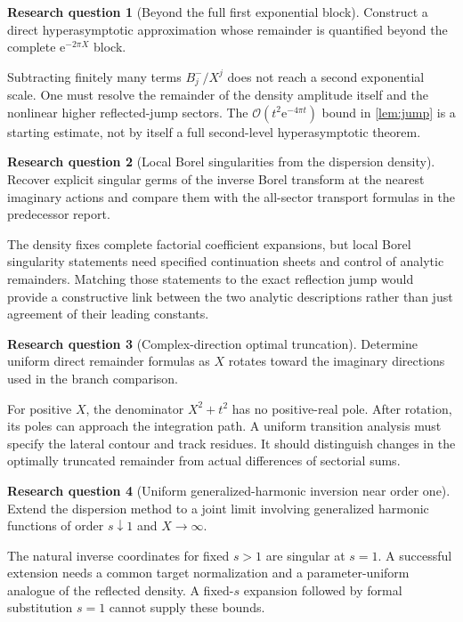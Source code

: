 \documentclass[11pt,a4paper]{article}
\theoremstyle{definition}
\newtheorem{problem}{Research question}
\numberwithin{equation}{section}
\newcommand{\ee}{\mathrm{e}}
\newcommand{\Oh}{\mathcal O}
\begin{document}
\begin{problem}[Beyond the full first exponential block]
Construct a direct hyperasymptotic approximation whose remainder is
quantified beyond the complete $\ee^{-2\pi X}$ block.
\end{problem}
Subtracting finitely many terms $B_j^-/X^j$ does not reach a second
exponential scale. One must resolve the remainder of the density
amplitude itself and the nonlinear higher reflected-jump sectors.
The $\Oh(t^2\ee^{-4\pi t})$ bound in \cref{lem:jump} is a starting
estimate, not by itself a full second-level hyperasymptotic theorem.

\begin{problem}[Local Borel singularities from the dispersion density]
Recover explicit singular germs of the inverse Borel transform at the
nearest imaginary actions and compare them with the all-sector
transport formulas in the predecessor report.
\end{problem}
The density fixes complete factorial coefficient expansions, but local
Borel singularity statements need specified continuation sheets and
control of analytic remainders. Matching those statements to the exact
reflection jump would provide a constructive link between the two
analytic descriptions rather than just agreement of their leading constants.

\begin{problem}[Complex-direction optimal truncation]
Determine uniform direct remainder formulas as $X$ rotates toward the
imaginary directions used in the branch comparison.
\end{problem}
For positive $X$, the denominator $X^2+t^2$ has no positive-real pole.
After rotation, its poles can approach the integration path. A uniform
transition analysis must specify the lateral contour and track residues.
It should distinguish changes in the optimally truncated remainder from
actual differences of sectorial sums.

\begin{problem}[Uniform generalized-harmonic inversion near order one]
Extend the dispersion method to a joint limit involving generalized
harmonic functions of order $s\downarrow1$ and $X\to\infty$.
\end{problem}
The natural inverse coordinates for fixed $s>1$ are singular at $s=1$.
A successful extension needs a common target normalization and a
parameter-uniform analogue of the reflected density. A fixed-$s$
expansion followed by formal substitution $s=1$ cannot supply these bounds.
\end{document}
